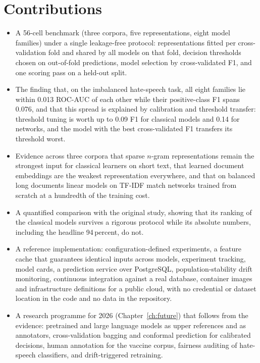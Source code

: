 \section{Contributions}
\begin{itemize}
\item A 56-cell benchmark (three corpora, five representations, eight model families) under a single leakage-free protocol: representations fitted per cross-validation fold and shared by all models on that fold, decision thresholds chosen on out-of-fold predictions, model selection by cross-validated F1, and one scoring pass on a held-out split.
\item The finding that, on the imbalanced hate-speech task, all eight families lie within 0.013 ROC-AUC of each other while their positive-class F1 spans 0.076, and that this spread is explained by calibration and threshold transfer: threshold tuning is worth up to 0.09 F1 for classical models and 0.14 for networks, and the model with the best cross-validated F1 transfers its threshold worst.
\item Evidence across three corpora that sparse $n$-gram representations remain the strongest input for classical learners on short text, that learned document embeddings are the weakest representation everywhere, and that on balanced long documents linear models on TF-IDF match networks trained from scratch at a hundredth of the training cost.
\item A quantified comparison with the original study, showing that its ranking of the classical models survives a rigorous protocol while its absolute numbers, including the headline 94\,percent, do not.
\item A reference implementation: configuration-defined experiments, a feature cache that guarantees identical inputs across models, experiment tracking, model cards, a prediction service over PostgreSQL, population-stability drift monitoring, continuous integration against a real database, container images and infrastructure definitions for a public cloud, with no credential or dataset location in the code and no data in the repository.
\item A research programme for 2026 (Chapter~\ref{ch:future}) that follows from the evidence: pretrained and large language models as upper references and as annotators, cross-validation bagging and conformal prediction for calibrated decisions, human annotation for the vaccine corpus, fairness auditing of hate-speech classifiers, and drift-triggered retraining.
\end{itemize}

